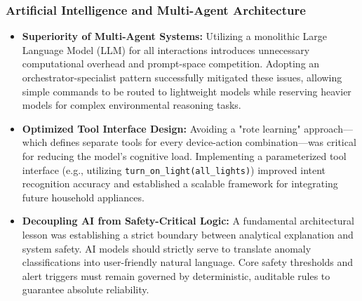 \subsubsection{Artificial Intelligence and Multi-Agent Architecture}
\begin{itemize}
    \item \textbf{Superiority of Multi-Agent Systems:} Utilizing a monolithic Large Language Model (LLM) for all interactions introduces unnecessary computational overhead and prompt-space competition. Adopting an orchestrator-specialist pattern successfully mitigated these issues, allowing simple commands to be routed to lightweight models while reserving heavier models for complex environmental reasoning tasks.
    \item \textbf{Optimized Tool Interface Design:} Avoiding a "rote learning" approach---which defines separate tools for every device-action combination---was critical for reducing the model's cognitive load. Implementing a parameterized tool interface (e.g., utilizing \texttt{turn\_on\_light(all\_lights)}) improved intent recognition accuracy and established a scalable framework for integrating future household appliances.
    \item \textbf{Decoupling AI from Safety-Critical Logic:} A fundamental architectural lesson was establishing a strict boundary between analytical explanation and system safety. AI models should strictly serve to translate anomaly classifications into user-friendly natural language. Core safety thresholds and alert triggers must remain governed by deterministic, auditable rules to guarantee absolute reliability.
\end{itemize}

